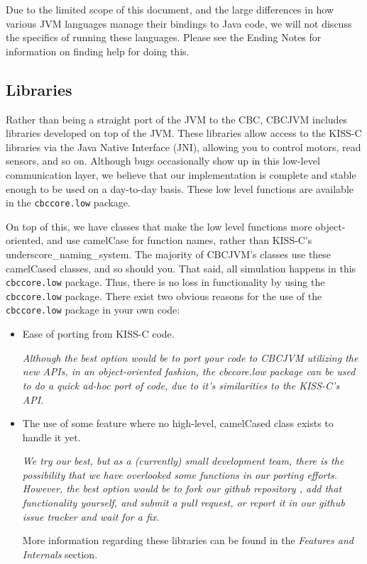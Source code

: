 \documentclass[12pt,letterpaper]{article}
\begin{document}
Due to the limited scope of this document, and the large differences in how various JVM languages manage their bindings to Java code, we will not discuss the specifics of running these languages. Please see the Ending Notes for information on finding help for doing this.



\subsection{Libraries}

Rather than being a straight port of the JVM to the CBC, CBCJVM includes libraries developed on top of the JVM. These libraries allow access to the KISS-C libraries via the Java Native Interface (JNI), allowing you to control motors, read sensors, and so on. Although bugs occasionally show up in this low-level communication layer, we believe that our implementation is complete and stable enough to be used on a day-to-day basis. These low level functions are available in the \texttt{cbccore.low} package.

On top of this, we have classes that make the low level functions more object-oriented, and use camelCase for function names, rather than KISS-C's underscore{\_}naming{\_}system. The majority of CBCJVM's classes use these camelCased classes, and so should you. That said, all simulation happens in this \texttt{cbccore.low} package. Thus, there is no loss in functionality by using the \texttt{cbccore.low} package. There exist two obvious reasons for the use of the \texttt{cbccore.low} package in your own code:
\begin{itemize}
\item Ease of porting from KISS-C code.

\textit{Although the best option would be to port your code to CBCJVM utilizing the new APIs, in an object-oriented fashion, the \textit{cbccore.low} package can be used to do a quick ad-hoc port of code, due to it's similarities to the KISS-C's API.}

\item The use of some feature where no high-level, camelCased class exists to handle it yet.

\textit{We try our best, but as a (currently) small development team, there is the possibility that we have overlooked some functions in our porting efforts. However, the best option would be to fork\cite{forking} our github repository
, add that functionality yourself, and submit a pull request\cite{pullRequest}, or report it in our github issue tracker  %
and wait for a fix.}

More information regarding these libraries can be found in the \textit{Features and Internals} section.
\end{itemize}
\end{document}

